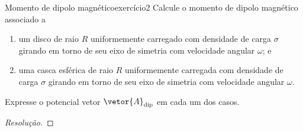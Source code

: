 \begin{exercício}{Momento de dipolo magnético}{exercício2}
    Calcule o momento de dipolo magnético associado a
    \begin{enumerate}[label=(\alph*)]
        \item um disco de raio \(R\) uniformemente carregado com densidade de carga \(\sigma\) girando em torno de seu eixo de simetria com velocidade angular \(\omega\); e
        \item uma casca esférica de raio \(R\) uniformemente carregada com densidade de carga \(\sigma\) girando em torno de seu eixo de simetria com velocidade angular \(\omega\).
    \end{enumerate}
    Expresse o potencial vetor \(\vetor{A}_\mathrm{dip}\) em cada um dos casos.
\end{exercício}
\begin{proof}[Resolução]

\end{proof}
